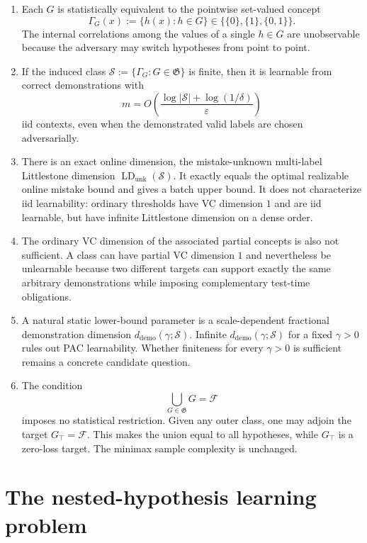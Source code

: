 \documentclass[11pt]{article}
\theoremstyle{definition}
\theoremstyle{remark}
\newcommand{\F}{\mathcal F}
\newcommand{\Outer}{\mathfrak G}
\newcommand{\SV}{\mathcal S}
\newcommand{\eps}{\varepsilon}
\newcommand{\LDu}{\operatorname{LD}_{\mathrm{unk}}}
\newcommand{\ddemo}{d_{\mathrm{demo}}}
\newcommand{\1}{\mathbf 1}
\begin{document}
\begin{enumerate}
    \item Each $G$ is statistically equivalent to the pointwise set-valued concept
    \[
        \Gamma_G(x):=\{h(x):h\in G\}\in\bigl\{\{0\},\{1\},\{0,1\}\bigr\}.
    \]
    The internal correlations among the values of a single $h\in G$ are unobservable because the adversary may switch hypotheses from point to point.

    \item If the induced class $\SV:=\{\Gamma_G:G\in\Outer\}$ is finite, then it is learnable from correct demonstrations with
    \[
        m=O\!\left(\frac{\log|\SV|+\log(1/\delta)}{\eps}\right)
    \]
    iid contexts, even when the demonstrated valid labels are chosen adversarially.

    \item There is an exact online dimension, the mistake-unknown multi-label Littlestone dimension $\LDu(\SV)$. It exactly equals the optimal realizable online mistake bound and gives a batch upper bound. It does not characterize iid learnability: ordinary thresholds have VC dimension $1$ and are iid learnable, but have infinite Littlestone dimension on a dense order.

    \item The ordinary VC dimension of the associated partial concepts is also not sufficient. A class can have partial VC dimension $1$ and nevertheless be unlearnable because two different targets can support exactly the same arbitrary demonstrations while imposing complementary test-time obligations.

    \item A natural static lower-bound parameter is a scale-dependent fractional demonstration dimension $\ddemo(\gamma;\SV)$. Infinite $\ddemo(\gamma;\SV)$ for a fixed $\gamma>0$ rules out PAC learnability. Whether finiteness for every $\gamma>0$ is sufficient remains a concrete candidate question.

    \item The condition
    \[
        \bigcup_{G\in\Outer}G=\F
    \]
    imposes no statistical restriction. Given any outer class, one may adjoin the target $G_{\top}=\F$. This makes the union equal to all hypotheses, while $G_{\top}$ is a zero-loss target. The minimax sample complexity is unchanged.
\end{enumerate}

\section{The nested-hypothesis learning problem}
\end{document}
